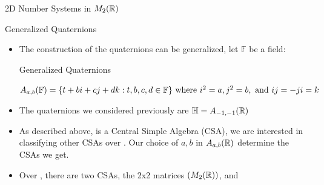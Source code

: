 \documentclass[t,slidestop,compress,mathserif,color=option,hyperref={pdfstartview={Fit},pdfpagelayout={SinglePage},pdfpagemode={UseOutlines}}]{beamer}
\begin{document}
\begin{frame}{2D Number Systems in $M_2(\protect\mathbb{R})$}
\end{frame}


\begin{frame}{Generalized Quaternions} 
\begin{itemize}
    \item The construction of the quaternions can be generalized, let $\mathbb{F}$ be a field:
    \begin{block}{Generalized Quaternions}
    \begin{center}
    $A_{a,b}(\mathbb{F}) = \{t + bi + cj + dk : t,b,c,d \in \mathbb{F}\} \\
    \text{ where }i^2 =a, j^2 = b, \text{ and } ij = -ji=k $
    \end{center}
    \end{block}
    \item The quaternions we considered previously are $\protect\mathbb{H}=A_{-1,-1}(\protect\mathbb{R})$
    \item As described above, \bH is a Central Simple Algebra (CSA), we are interested in classifying other CSAs over \bR. Our choice of $a,b$ in $A_{a,b}(\protect\mathbb{R})$ determine the CSAs we get.
    \item Over \bR, there are two CSAs, the 2x2 matrices $(M_2(\protect\mathbb{R}))$, and \bH
\end{itemize}
\end{frame}
\end{document}
